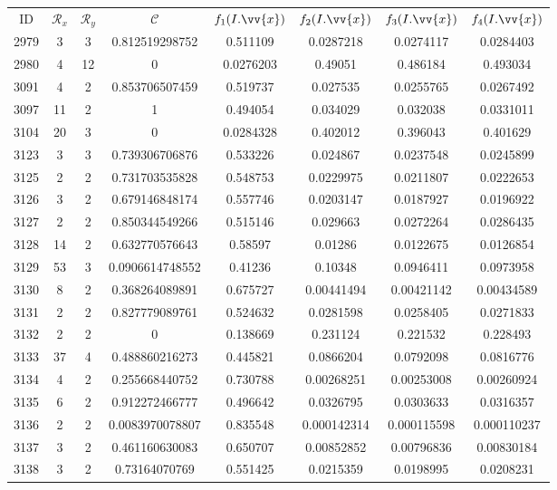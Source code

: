 \scriptsize
\begin{longtable}{|c|c|c|c|c|c|c|c|}
\hline
ID & $\mathscr{R}_x$ & $\mathscr{R}_y$ & $\mathscr{C}$ & $f_1(I.\vv{x})$ & $f_2(I.\vv{x})$ & $f_3(I.\vv{x})$ & $f_4(I.\vv{x})$ \\
2979 & 3 & 3 & 0.812519298752 & 0.511109 & 0.0287218 & 0.0274117 & 0.0284403 \\
2980 & 4 & 12 & 0 & 0.0276203 & 0.49051 & 0.486184 & 0.493034 \\
3091 & 4 & 2 & 0.853706507459 & 0.519737 & 0.027535 & 0.0255765 & 0.0267492 \\
3097 & 11 & 2 & 1 & 0.494054 & 0.034029 & 0.032038 & 0.0331011 \\
3104 & 20 & 3 & 0 & 0.0284328 & 0.402012 & 0.396043 & 0.401629 \\
3123 & 3 & 3 & 0.739306706876 & 0.533226 & 0.024867 & 0.0237548 & 0.0245899 \\
3125 & 2 & 2 & 0.731703535828 & 0.548753 & 0.0229975 & 0.0211807 & 0.0222653 \\
3126 & 3 & 2 & 0.679146848174 & 0.557746 & 0.0203147 & 0.0187927 & 0.0196922 \\
3127 & 2 & 2 & 0.850344549266 & 0.515146 & 0.029663 & 0.0272264 & 0.0286435 \\
3128 & 14 & 2 & 0.632770576643 & 0.58597 & 0.01286 & 0.0122675 & 0.0126854 \\
3129 & 53 & 3 & 0.0906614748552 & 0.41236 & 0.10348 & 0.0946411 & 0.0973958 \\
3130 & 8 & 2 & 0.368264089891 & 0.675727 & 0.00441494 & 0.00421142 & 0.00434589 \\
3131 & 2 & 2 & 0.827779089761 & 0.524632 & 0.0281598 & 0.0258405 & 0.0271833 \\
3132 & 2 & 2 & 0 & 0.138669 & 0.231124 & 0.221532 & 0.228493 \\
3133 & 37 & 4 & 0.488860216273 & 0.445821 & 0.0866204 & 0.0792098 & 0.0816776 \\
3134 & 4 & 2 & 0.255668440752 & 0.730788 & 0.00268251 & 0.00253008 & 0.00260924 \\
3135 & 6 & 2 & 0.912272466777 & 0.496642 & 0.0326795 & 0.0303633 & 0.0316357 \\
3136 & 2 & 2 & 0.0083970078807 & 0.835548 & 0.000142314 & 0.000115598 & 0.000110237 \\
3137 & 3 & 2 & 0.461160630083 & 0.650707 & 0.00852852 & 0.00796836 & 0.00830184 \\
3138 & 3 & 2 & 0.73164070769 & 0.551425 & 0.0215359 & 0.0198995 & 0.0208231 \\

\end{longtable}
